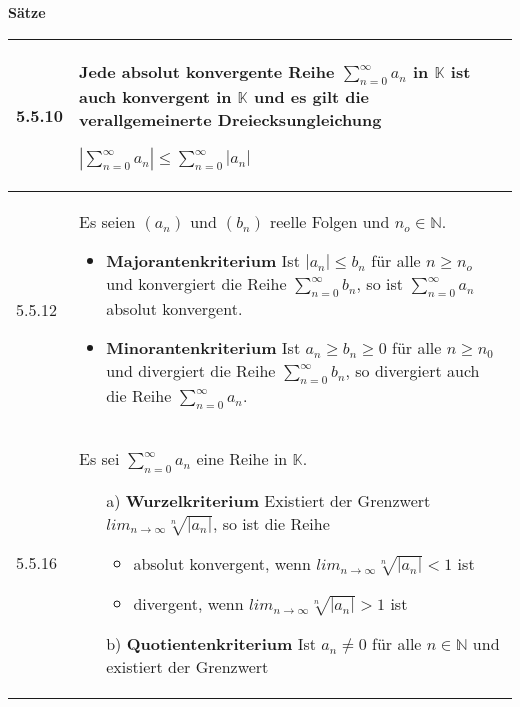     \noindent 
    \textbf{Sätze}
    \begin{table}[H]
    \begin{tabularx}{\textwidth}{X m{16cm}}
        \toprule

        5.5.10& Jede absolut konvergente Reihe $\sum^{\infty}_{n=0} a_n$ in $\mathbb{K}$ ist auch konvergent in $\mathbb{K}$ und es
                gilt die verallgemeinerte Dreiecksungleichung \hfill \break
                \centerline{$|\sum^{\infty}_{n=0}a_n| \leq \sum^{\infty}_{n=0} |a_n|$} \\
        \midrule
        5.5.12& Es seien $(a_n)$ und $(b_n)$ reelle Folgen und $n_o \in \mathbb{N}$.
                \begin{itemize}[topsep=-0.5cm]
                    \item \textbf{Majorantenkriterium} \hfill \break 
                            Ist $|a_n| \leq b_n$ für alle $n \geq n_o$ und konvergiert die Reihe $\sum^{\infty}_{n=0}b_n$, so ist
                            $\sum^{\infty}_{n=0} a_n$ absolut konvergent.
                    \item \textbf{Minorantenkriterium} \hfill \break
                            Ist $a_n \geq b_n \geq 0$ für alle $n \geq n_0$ und divergiert die Reihe $\sum^{\infty}_{n=0}b_n$, so 
                            divergiert auch die Reihe $\sum^{\infty}_{n=0}a_n$. 
                \end{itemize} \vspace{-0cm} \\
        \midrule
        5.5.16& Es sei $\sum^{\infty}_{n=0}a_n$ eine Reihe in $\mathbb{K}$.
                \begin{itemize}[topsep=-0.5cm]
                    \item[a)] \textbf{Wurzelkriterium} \hfill \break
                            Existiert der Grenzwert $lim_{n \rightarrow \infty} \sqrt[n]{|a_n|}$, so ist die Reihe
                            \begin{itemize}[topsep=-0.5cm]
                                \item absolut konvergent, wenn $lim_{n \rightarrow \infty} \sqrt[n]{|a_n|} < 1$ ist
                                \item divergent, wenn $lim_{n \rightarrow \infty} \sqrt[n]{|a_n|} > 1$ ist
                            \end{itemize}
                    \item[b)] \textbf{Quotientenkriterium} \hfill \break
                            Ist $a_n \neq 0$ für alle $n \in \mathbb{N}$ und existiert der Grenzwert 

\end{itemize}
\end{tabularx}
\end{table}
